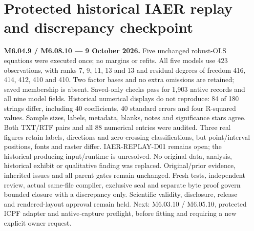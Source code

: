 \documentclass[11pt,a4paper]{article}
\begin{document}
\section*{Protected historical IAER replay and discrepancy checkpoint}
\noindent\textbf{M6.04.9 / M6.08.10 --- 9 October 2026.}
Five unchanged robust-OLS equations were executed once; no margins or refits.
All five models use 423 observations, with ranks 7, 9, 11, 13 and 13
and residual degrees of freedom 416, 414, 412, 410 and 410.
Two factor bases and no extra omissions are retained; saved membership is absent.
Saved-only checks pass for 1,903 native records and all nine model fields.
Historical numerical displays do not reproduce: 84 of 180 strings differ,
including 40 coefficients, 40 standard errors and four R-squared values.
Sample sizes, labels, metadata, blanks, notes and significance stars agree.
Both TXT/RTF pairs and all 88 numerical entries were audited.
Three real figures retain labels, directions and zero-crossing classifications,
but point/interval positions, fonts and raster differ.
IAER-REPLAY-D01 remains open; the historical producing input/runtime is unresolved.
No original data, analysis, historical exhibit or qualitative finding was replaced.
Original/prior evidence, inherited issues and all parent gates remain unchanged.
Fresh tests, independent review, actual same-file compiler, exclusive seal
and separate byte proof govern bounded closure with a discrepancy only.
Scientific validity, disclosure, release and rendered-layout approval remain held.
Next: M6.03.10 / M6.05.10, protected ICPF adapter and native-capture preflight,
before fitting and requiring a new explicit owner request.
\end{document}
